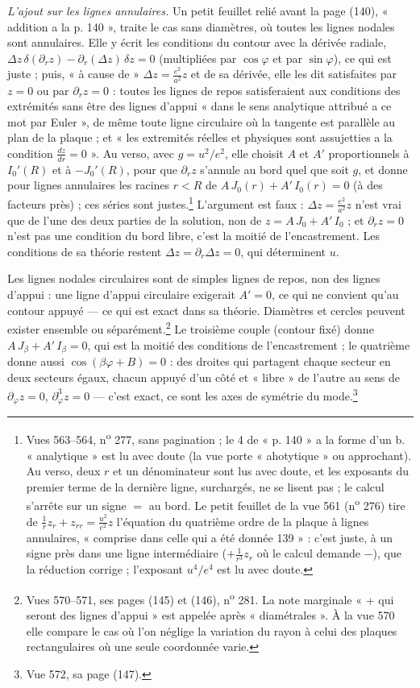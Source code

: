\documentclass[11pt,a4paper]{article}
\begin{document}
\emph{L'ajout sur les lignes annulaires.} Un petit feuillet relié avant la page
(140), « addition a la p. 140 », traite le cas sans diamètres, où toutes les
lignes nodales sont annulaires. Elle y écrit les conditions du contour avec la
dérivée radiale, $\Delta z\,\delta(\partial_r z) - \partial_r(\Delta z)\,\delta z
= 0$ (multipliées par $\cos\varphi$ et par $\sin\varphi$), ce qui est juste ; puis,
« à cause de » $\Delta z = \frac{e^2}{a^2}z$ et de sa dérivée, elle les dit
satisfaites par $z = 0$ ou par $\partial_r z = 0$ : toutes les lignes de repos
satisferaient aux conditions des extrémités sans être des lignes d'appui « dans le
sens analytique attribué a ce mot par Euler », de même toute ligne circulaire où
la tangente est parallèle au plan de la plaque ; et « les extremités réelles et
physiques sont assujetties a la condition $\frac{dz}{dr} = 0$ ». Au verso, avec
$g = u^2/e^2$, elle choisit $A$ et $A'$ proportionnels à $I_0'(R)$ et à
$-J_0'(R)$, pour que $\partial_r z$ s'annule au bord quel que soit $g$, et
donne pour lignes annulaires les racines $r<R$ de $A\,J_0(r)+A'\,I_0(r) = 0$ (à
des facteurs près) ; ces séries sont justes.\footnote{Vues 563--564,
n\textsuperscript{o} 277, sans pagination ; le 4 de « p. 140 » a la forme d'un
b. « analytique » est lu avec doute (la vue porte « ahotytique » ou approchant).
Au verso, deux $r$ et un dénominateur sont lus avec doute, et les exposants du
premier terme de la dernière ligne, surchargés, ne se lisent pas ; le calcul
s'arrête sur un signe $=$ au bord. Le petit feuillet de la vue 561
(n\textsuperscript{o} 276) tire de $\frac1r z_r + z_{rr} = \frac{u^2}{e^2}z$
l'équation du quatrième ordre de la plaque à lignes annulaires, « comprise dans
celle qui a été donnée 139 » : c'est juste, à un signe près dans une ligne
intermédiaire ($+\frac{1}{r^3}z_r$ où le calcul demande $-$), que la réduction
corrige ; l'exposant $u^4/e^4$ est lu avec doute.} L'argument est faux :
$\Delta z = \frac{e^2}{a^2}z$ n'est vrai que de l'une des deux parties de la
solution, non de $z = A\,J_0 + A'\,I_0$ ; et $\partial_r z = 0$ n'est pas une
condition du bord libre, c'est la moitié de l'encastrement. Les conditions de
sa théorie restent $\Delta z = \partial_r\Delta z = 0$, qui déterminent $u$.

Les lignes nodales circulaires sont de simples lignes de repos, non des lignes
d'appui : une ligne d'appui circulaire exigerait $A' = 0$, ce qui ne convient
qu'au contour appuyé — ce qui est exact dans sa théorie. Diamètres et cercles
peuvent exister ensemble ou séparément.\footnote{Vues 570--571, ses pages (145)
et (146), n\textsuperscript{o} 281. La note marginale « + qui seront des lignes
d'appui » est appelée après « diamétrales ». À la vue 570 elle compare le cas où
l'on néglige la variation du rayon à celui des plaques rectangulaires où une
seule coordonnée varie.} Le troisième couple (contour fixé) donne
$A\,J_\beta + A'\,I_\beta = 0$, qui est la moitié des conditions de
l'encastrement ; le quatrième donne aussi $\cos(\beta\varphi+B) = 0$ : des
droites qui partagent chaque secteur en deux secteurs égaux, chacun appuyé d'un
côté et « libre » de l'autre au sens de $\partial_\varphi z = 0$,
$\partial_\varphi^3 z = 0$ — c'est exact, ce sont les axes de symétrie du
mode.\footnote{Vue 572, sa page (147).}
\end{document}
